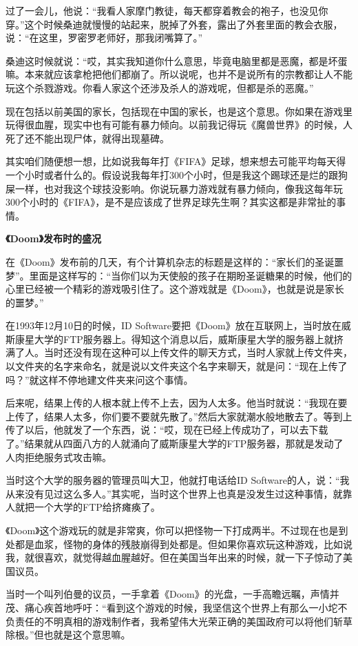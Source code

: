 \documentclass[
  letterpaper,
  DIV=11,
  numbers=noendperiod]{scrreprt}
\begin{document}
过了一会儿，他说：``我看人家摩门教徒，每天都穿着教会的袍子，也没见你穿。''这个时候桑迪就慢慢的站起来，脱掉了外套，露出了外套里面的教会衣服，说：``在这里，罗密罗老师好，那我闭嘴算了。''

桑迪这时候就说：``哎，其实我知道你什么意思，毕竟电脑里都是恶魔，都是坏蛋嘛。本来就应该拿枪把他们都崩了。所以说呢，也并不是说所有的宗教都让人不能玩这个杀戮游戏。你看人家这个还涉及杀人的游戏呢，但都是杀的恶魔。''

现在包括以前美国的家长，包括现在中国的家长，也是这个意思。你如果在游戏里玩得很血腥，现实中也有可能有暴力倾向。以前我记得玩《魔兽世界》的时候，人死了还不能出现尸体，就得出现墓碑。

其实咱们随便想一想，比如说我每年打《FIFA》足球，想来想去可能平均每天得一个小时或者什么的。假设说我每年打300个小时，但是我这个踢球还是烂的跟狗屎一样，也对我这个球技没影响。你说玩暴力游戏就有暴力倾向，像我这每年玩300个小时的《FIFA》，是不是应该成了世界足球先生啊？其实这都是非常扯的事情。

\textbf{《Doom》发布时的盛况}

在《Doom》发布前的几天，有个计算机杂志的标题是这样的：``家长们的圣诞噩梦''。里面是这样写的：``当你们以为天使般的孩子在期盼圣诞糖果的时候，他们的心里已经被一个精彩的游戏吸引住了。这个游戏就是《Doom》，也就是说是家长的噩梦。''

在1993年12月10日的时候，ID
Software要把《Doom》放在互联网上，当时放在威斯康星大学的FTP服务器上。得知这个消息以后，威斯康星大学的服务器上就挤满了人。当时还没有现在这种可以上传文件的聊天方式，当时人家就上传文件夹，以文件夹的名字来命名，就是说以文件夹这个名字来聊天，就是问：``现在上传了吗？''就这样不停地建文件夹来问这个事情。

后来呢，结果上传的人根本就上传不上去，因为人太多。他当时就说：``我现在要上传了，结果人太多，你们要不要就先散了。''然后大家就潮水般地散去了。等到上传了以后，他就发了一个东西，说：``哎，现在已经上传成功了，可以去下载了。''结果就从四面八方的人就涌向了威斯康星大学的FTP服务器，那就是发动了人肉拒绝服务式攻击嘛。

当时这个大学的服务器的管理员叫大卫，他就打电话给ID
Software的人，说：``我从来没有见过这么多人。''其实呢，当时这个世界上也真是没发生过这种事情，就靠人就把一个大学的FTP给挤瘫痪了。

《Doom》这个游戏玩的就是非常爽，你可以把怪物一下打成两半。不过现在也是到处都是血浆，怪物的身体的残肢崩得到处都是。但如果你喜欢玩这种游戏，比如说我，就很喜欢，就觉得越血腥越好。但在美国当年出来的时候，就一下子惊动了美国议员。

当时一个叫列伯曼的议员，一手拿着《Doom》的光盘，一手高瞻远瞩，声情并茂、痛心疾首地呼吁：``看到这个游戏的时候，我坚信这个世界上有那么一小坨不负责任的不明真相的游戏制作者，我希望伟大光荣正确的美国政府可以将他们斩草除根。''但也就是这个意思嘛。
\end{document}
